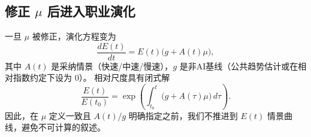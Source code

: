 \subsection{修正 $\mu$ 后进入职业演化}

一旦 $\mu$ 被修正，演化方程变为
\begin{equation}
    \frac{dE(t)}{dt}=E(t)\big(g + A(t)\mu\big),
\end{equation}
其中 $A(t)$ 是采纳情景（快速/中速/慢速），$g$ 是非AI基线（公共趋势估计或在相对指数约定下设为 $0$）。
相对尺度具有闭式解
\begin{equation}
    \frac{E(t)}{E(t_0)}=\exp\left(\int_{t_0}^{t}\big(g+A(\tau)\mu\big)\,d\tau\right).
\end{equation}
因此，在 $\mu$ 定义一致且 $A(t)$/$g$ 明确指定之前，我们不推进到 $E(t)$ 情景曲线，避免不可计算的叙述。
